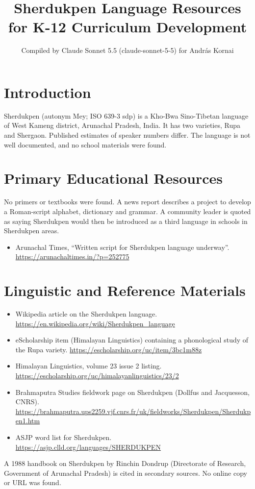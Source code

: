 \documentclass[12pt]{article}
\title{Sherdukpen Language Resources for K-12 Curriculum Development}
\author{Compiled by Claude Sonnet 5.5 (claude-sonnet-5-5) for Andr\'as Kornai}
\date{}
\begin{document}
\maketitle

\section{Introduction}
Sherdukpen (autonym Mey; ISO 639-3 sdp) is a Kho-Bwa Sino-Tibetan language of West Kameng district, Arunachal Pradesh, India. It has two varieties, Rupa and Shergaon. Published estimates of speaker numbers differ. The language is not well documented, and no school materials were found.

\section{Primary Educational Resources}
No primers or textbooks were found. A news report describes a project to develop a Roman-script alphabet, dictionary and grammar. A community leader is quoted as saying Sherdukpen would then be introduced as a third language in schools in Sherdukpen areas.
\begin{itemize}
\item Arunachal Times, ``Written script for Sherdukpen language underway''. \url{https://arunachaltimes.in/?p=252775}
\end{itemize}

\section{Linguistic and Reference Materials}
\begin{itemize}
\item Wikipedia article on the Sherdukpen language. \url{https://en.wikipedia.org/wiki/Sherdukpen_language}
\item eScholarship item (Himalayan Linguistics) containing a phonological study of the Rupa variety. \url{https://escholarship.org/uc/item/3bc1m88z}
\item Himalayan Linguistics, volume 23 issue 2 listing. \url{https://escholarship.org/uc/himalayanlinguistics/23/2}
\item Brahmaputra Studies fieldwork page on Sherdukpen (Dollfus and Jacquesson, CNRS). \url{https://brahmaputra.ups2259.vjf.cnrs.fr/uk/fieldworks/Sherdukpen/Sherdukpen1.htm}
\item ASJP word list for Sherdukpen. \url{https://asjp.clld.org/languages/SHERDUKPEN}
\end{itemize}
A 1988 handbook on Sherdukpen by Rinchin Dondrup (Directorate of Research, Government of Arunachal Pradesh) is cited in secondary sources. No online copy or URL was found.
\end{document}

